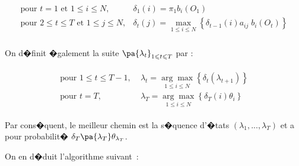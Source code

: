         \begin{eqnarray}
        \begin{array}{rl}
        \text{pour }t=1 \text{ et } 1\leqslant i\leqslant N, & \delta_{1}\left(  i\right) =\pi_{1}b_{i}\left(  O_{1}\right)\\
        \text{pour }2\leqslant t\leqslant T \text{ et } 1\leqslant j\leqslant N, &
                    \delta _{t}\left(  j\right)  =\underset{1\leqslant i\leqslant N}{\max}\left\{ \delta_{t-1}\left(  i\right)  a_{ij}
                    \; b_{i}\left(  O_{t}\right)  \right\}  \\
        \end{array}
        \label{hmm_viterbi_eq_3}
        \end{eqnarray}

On d�finit �galement la suite $\pa{ \lambda_{t}}_{1\leqslant t\leqslant T}$ par :

        \begin{eqnarray}
        \begin{array}{rl}
        \text{pour }1\leqslant t\leqslant T-1, \; & \lambda _{t} =\underset{1\leqslant i\leqslant
            N}{\arg\max} \left\{ \delta_{t}\left(  \lambda_{t+1}\right)  \right\} \\
        \text{pour }t=T, \; & \lambda_{T} =\underset{1\leqslant i\leqslant N}{\arg\max}\left\{ \delta_{T}\left( i\right)\theta_i \right\}
        \end{array}
        \label{hmm_viterbi_eq_4}
        \end{eqnarray}

Par cons�quent, le meilleur chemin est la s�quence d'�tats $\left(  \lambda_{1},...,\lambda_{T}\right)  $ et a pour probabilit�
$\delta_T\pa{\lambda_T}\theta_{\lambda_T}$.

On en d�duit l'algorithme suivant~:

